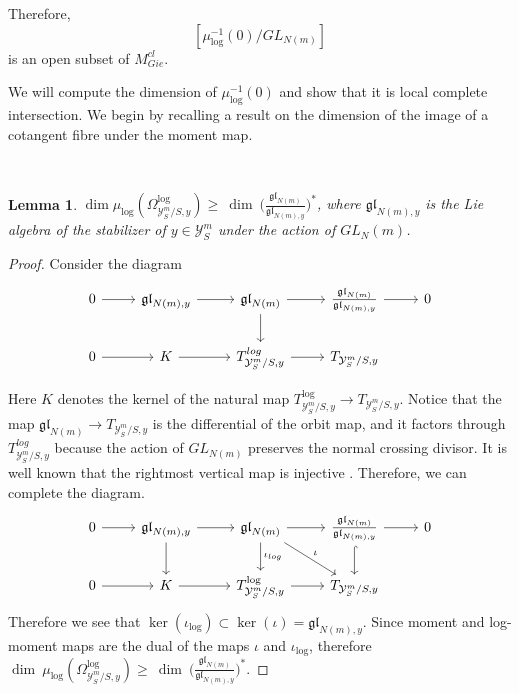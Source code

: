 \documentclass[11pt]{amsart}
\theoremstyle{plain}
\numberwithin{equation}{section}
\theoremstyle{definition}
\theoremstyle{plain}
\newtheorem{Lem}[Def]{Lemma}
\begin{document}
Therefore, $$[\mu_{\log}^{-1}(0)/GL_{N(m)}]$$ is an open subset of $M^{cl}_{Gie}$. 

We will compute the dimension of $\mu_{\log}^{-1}(0)$ and show that it is local complete intersection. We begin by recalling a result on the dimension of the image of a cotangent fibre under the moment map. 

\

\begin{Lem}\label{Moment}
$\dim \mu_{\log}(\Omega^{\log}_{\mathcal Y^m_S/S,y})\geq ~\dim~\big (\frac{\mathfrak{gl}_{N(m)}}{\mathfrak{gl}_{N(m), y}}\big )^*$, where $\mathfrak{gl}_{N(m),y}$ is the Lie algebra of the stabilizer of $y \in \mathcal Y^m_S$ under the action of $GL_N(m)$.
\end{Lem}

\begin{proof}
Consider the diagram
\begin{equation}
\begin{tikzcd}
0\arrow{r} & \mathfrak{gl}_{N(m), y}\arrow{r} & \mathfrak{gl}_{N(m)}\arrow{r}\arrow{d} & \frac{\mathfrak{gl}_{N(m)}}{\mathfrak{gl}_{N(m), y}}\arrow{r} & 0\\
0\arrow{r} & K\arrow{r} & T^{log}_{\mathcal Y^m_S/S,y}\arrow{r} & T_{\mathcal Y^m_S/S,y}
\end{tikzcd}
\end{equation}

Here $K$ denotes the kernel of the natural map $T^{\log}_{\mathcal Y^m_S/S,y}\longrightarrow  T_{\mathcal Y^m_S/S,y}$. Notice that the map $\mathfrak{gl}_{N(m)}\longrightarrow T_{\mathcal Y^m_S/S,y}$ is the differential of the orbit map, and it factors through $T^{log}_{\mathcal Y^m_S/S,y}$ because the action of $GL_{N(m)}$ preserves the normal crossing divisor. It is well known that the rightmost vertical map is injective \cite[Lemma 2.4.1]{32e}. Therefore, we can complete the diagram. 
\begin{equation}
\begin{tikzcd}
0\arrow{r} & \mathfrak{gl}_{N(m), y}\arrow{r}\arrow{d} & \mathfrak{gl}_{N(m)}\arrow{r}\arrow["\iota"]{dr}\arrow["\iota_{log}"]{d} & \frac{\mathfrak{gl}_{N(m)}}{\mathfrak{gl}_{N(m), y}}\arrow{r}\arrow[hook]{d} & 0\\
0\arrow{r} & K\arrow{r} & T^{\log}_{\mathcal Y^m_S/S,y}\arrow{r} & T_{\mathcal Y^m_S/S,y}
\end{tikzcd}
\end{equation}
Therefore we see that $\ker (\iota_{\log})\subset \ker (\iota)=\mathfrak{gl}_{N(m), y}$. Since moment and log-moment maps are the dual of the maps $\iota$ and $\iota_{\log}$, therefore $\dim~ \mu_{\log}(\Omega^{\log}_{\mathcal Y^m_S/S,y})\geq ~\dim~\big (\frac{\mathfrak{gl}_{N(m)}}{\mathfrak{gl}_{N(m), y}}\big )^*$. 
\end{proof}
\end{document}
